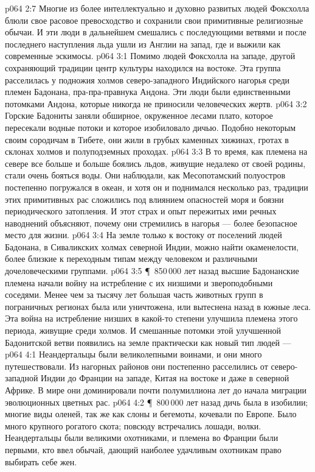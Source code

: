 \vs p064 2:7 Многие из более интеллектуально и духовно развитых людей Фоксхолла блюли свое расовое превосходство и сохранили свои примитивные религиозные обычаи. И эти люди в дальнейшем смешались с последующими ветвями и после последнего наступления льда ушли из Англии на запад, где и выжили как современные эскимосы.
\vs p064 3:1 Помимо людей Фоксхолла на западе, другой сохраняющий традиции центр культуры находился на востоке. Эта группа расселилась у подножия холмов северо\hyp{}западного Индийского нагорья среди племен Бадонана, пра\hyp{}пра\hyp{}правнука Андона. Эти люди были единственными потомками Андона, которые никогда не приносили человеческих жертв.
\vs p064 3:2 Горские Бадониты заняли обширное, окруженное лесами плато, которое пересекали водные потоки и которое изобиловало дичью. Подобно некоторым своим сородичам в Тибете, они жили в грубых каменных хижинах, гротах в склонах холмов и полуподземных проходах.
\vs p064 3:3 В то время, как племена на севере все больше и больше боялись льдов, живущие недалеко от своей родины, стали очень бояться воды. Они наблюдали, как Месопотамский полуостров постепенно погружался в океан, и хотя он и поднимался несколько раз, традиции этих примитивных рас сложились под влиянием опасностей моря и боязни периодического затопления. И этот страх и опыт пережитых ими речных наводнений объясняют, почему они стремились в нагорья --- более безопасное место для жизни.
\vs p064 3:4 На земле только к востоку от поселений людей Бадонана, в Сиваликских холмах северной Индии, можно найти окаменелости, более близкие к переходным типам между человеком и различными дочеловеческими группами.
\vs p064 3:5 \P\ 850\,000 лет назад высшие Бадонанские племена начали войну на истребление с их низшими и звероподобными соседями. Менее чем за тысячу лет большая часть животных групп в пограничных регионах была или уничтожена, или вытеснена назад в южные леса. Эта война на истребление низших в какой\hyp{}то степени улучшила племена этого периода, живущие среди холмов. И смешанные потомки этой улучшенной Бадонитской ветви появились на земле практически как новый тип людей --- 
\vs p064 4:1 Неандертальцы были великолепными воинами, и они много путешествовали. Из нагорных районов они постепенно расселились от северо\hyp{}западной Индии до Франции на западе, Китая на востоке и даже в северной Африке. В мире они доминировали почти полумиллиона лет до начала миграции эволюционных цветных рас.
\vs p064 4:2 \P\ 800\,000 лет назад дичь была в изобилии; многие виды оленей, так же как слоны и бегемоты, кочевали по Европе. Было много крупного рогатого скота; повсюду встречались лошади, волки. Неандертальцы были великими охотниками, и племена во Франции были первыми, кто ввел обычай, дающий наиболее удачливым охотникам право выбирать себе жен.
